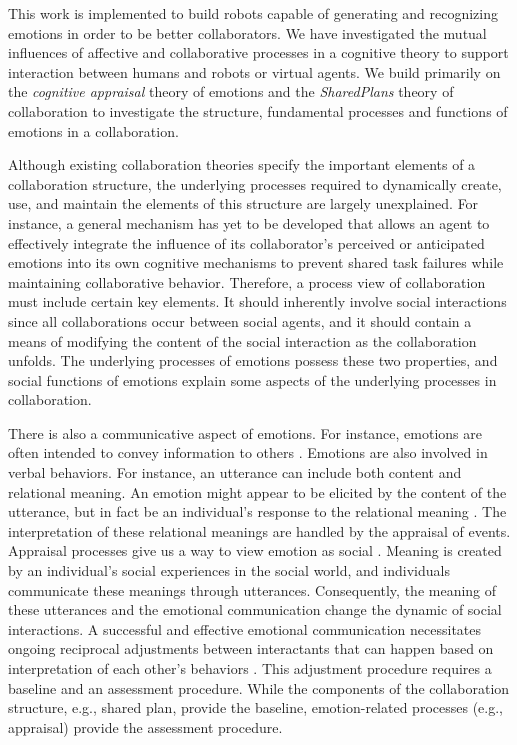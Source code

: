 \documentclass[12pt]{report}
\begin{document}
This work is implemented to build robots capable of generating and recognizing
emotions in order to be better collaborators. We have investigated the mutual
influences of affective and collaborative processes in a cognitive theory to
support interaction between humans and robots or virtual agents. We build
primarily on the \textit{cognitive appraisal} theory of emotions and the
\textit{SharedPlans} theory of collaboration to investigate the structure,
fundamental processes and functions of emotions in a collaboration.

Although existing collaboration theories specify the important elements of a
collaboration structure, the underlying processes required to dynamically
create, use, and maintain the elements of this structure are largely
unexplained. For instance, a general mechanism has yet to be developed that
allows an agent to effectively integrate the influence of its collaborator's
perceived or anticipated emotions into its own cognitive mechanisms to prevent
shared task failures while maintaining collaborative behavior. Therefore, a
process view of collaboration must include certain key elements. It should
inherently involve social interactions since all collaborations occur between
social agents, and it should contain a means of modifying the content of the
social interaction as the collaboration unfolds. The underlying processes of
emotions possess these two properties, and social functions of emotions explain
some aspects of the underlying processes in collaboration.

There is also a communicative aspect of emotions. For instance, emotions are
often intended to convey information to others \cite{goffman:self-presentation}.
Emotions are also involved in verbal behaviors. For instance, an utterance can
include both content and relational meaning. An emotion might appear to be
elicited by the content of the utterance, but in fact be an individual's
response to the relational meaning \cite{planalp:communicating-emotion}. The
interpretation of these relational meanings are handled by the appraisal of
events. Appraisal processes give us a way to view emotion as social
\cite{hooft:sharing-emotions}. Meaning is created by an individual's social
experiences in the social world, and individuals communicate these meanings
through utterances. Consequently, the meaning of these utterances and the
emotional communication change the dynamic of social interactions. A successful
and effective emotional communication necessitates ongoing reciprocal
adjustments between interactants that can happen based on interpretation of each
other's behaviors \cite{parkinson:emotion-social-interaction}. This adjustment
procedure requires a baseline and an assessment procedure. While the components
of the collaboration structure, e.g., shared plan, provide the baseline,
emotion-related processes (e.g., appraisal) provide the assessment procedure.
\end{document}
